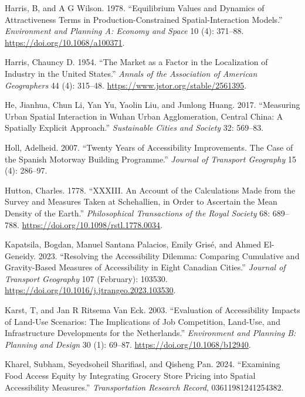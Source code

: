 \documentclass[
]{article}
\newlength{\cslhangindent}
\newenvironment{CSLReferences}[2] %
 {\begin{list}{}{%
  \setlength{\itemindent}{0pt}
  \setlength{\leftmargin}{0pt}
  \setlength{\parsep}{0pt}
  \ifodd #1
   \setlength{\leftmargin}{\cslhangindent}
   \setlength{\itemindent}{-1\cslhangindent}
  \fi
  \setlength{\itemsep}{#2\baselineskip}}}
 {\end{list}}
\begin{document}
\begin{CSLReferences}{1}{0}
Harris, B, and A G Wilson. 1978. {``Equilibrium Values and Dynamics of
Attractiveness Terms in Production-Constrained Spatial-Interaction
Models.''} \emph{Environment and Planning A: Economy and Space} 10 (4):
371--88. \url{https://doi.org/10.1068/a100371}.

Harris, Chauncy D. 1954. {``The {Market} as a {Factor} in the
{Localization} of {Industry} in the {United} {States}.''} \emph{Annals
of the Association of American Geographers} 44 (4): 315--48.
\url{https://www.jstor.org/stable/2561395}.

He, Jianhua, Chun Li, Yan Yu, Yaolin Liu, and Junlong Huang. 2017.
{``Measuring Urban Spatial Interaction in Wuhan Urban Agglomeration,
Central China: A Spatially Explicit Approach.''} \emph{Sustainable
Cities and Society} 32: 569--83.

Holl, Adelheid. 2007. {``Twenty Years of Accessibility Improvements. The
Case of the Spanish Motorway Building Programme.''} \emph{Journal of
Transport Geography} 15 (4): 286--97.

Hutton, Charles. 1778. {``{XXXIII}. {An} Account of the Calculations
Made from the Survey and Measures Taken at {Schehallien}, in Order to
Ascertain the Mean Density of the {Earth}.''} \emph{Philosophical
Transactions of the Royal Society} 68: 689--788.
\url{https://doi.org/10.1098/rstl.1778.0034}.

Kapatsila, Bogdan, Manuel Santana Palacios, Emily Grisé, and Ahmed
El-Geneidy. 2023. {``Resolving the Accessibility Dilemma: {Comparing}
Cumulative and Gravity-Based Measures of Accessibility in Eight
{Canadian} Cities.''} \emph{Journal of Transport Geography} 107
(February): 103530.
\url{https://doi.org/10.1016/j.jtrangeo.2023.103530}.

Karst, T, and Jan R Ritsema Van Eck. 2003. {``Evaluation of
Accessibility Impacts of Land-Use Scenarios: The Implications of Job
Competition, Land-Use, and Infrastructure Developments for the
Netherlands.''} \emph{Environment and Planning B: Planning and Design}
30 (1): 69--87. \url{https://doi.org/10.1068/b12940}.

Kharel, Subham, Seyedsoheil Sharifiasl, and Qisheng Pan. 2024.
{``Examining Food Access Equity by Integrating Grocery Store Pricing
into Spatial Accessibility Measures.''} \emph{Transportation Research
Record}, 03611981241254382.


\end{CSLReferences}
\end{document}
